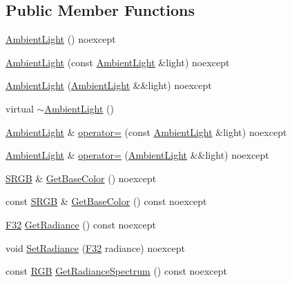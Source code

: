 \subsection*{Public Member Functions}
\begin{DoxyCompactItemize}
\item 
\hyperlink{classmage_1_1rendering_1_1_ambient_light_a178327bf02552f65b98ad3858416a81d}{Ambient\+Light} () noexcept
\item 
\hyperlink{classmage_1_1rendering_1_1_ambient_light_a363ca4f79eef6f0a95a2e3d381479af1}{Ambient\+Light} (const \hyperlink{classmage_1_1rendering_1_1_ambient_light}{Ambient\+Light} \&light) noexcept
\item 
\hyperlink{classmage_1_1rendering_1_1_ambient_light_a8bd09baed470ce2c09af6a9893549937}{Ambient\+Light} (\hyperlink{classmage_1_1rendering_1_1_ambient_light}{Ambient\+Light} \&\&light) noexcept
\item 
virtual \hyperlink{classmage_1_1rendering_1_1_ambient_light_a811cb86e80188b924085674a88a0bf7b}{$\sim$\+Ambient\+Light} ()
\item 
\hyperlink{classmage_1_1rendering_1_1_ambient_light}{Ambient\+Light} \& \hyperlink{classmage_1_1rendering_1_1_ambient_light_a351cdcd2e1b25c6a44356060f0e61c2b}{operator=} (const \hyperlink{classmage_1_1rendering_1_1_ambient_light}{Ambient\+Light} \&light) noexcept
\item 
\hyperlink{classmage_1_1rendering_1_1_ambient_light}{Ambient\+Light} \& \hyperlink{classmage_1_1rendering_1_1_ambient_light_aa571cc046cb35ceafba6cb0a2ec4bd6c}{operator=} (\hyperlink{classmage_1_1rendering_1_1_ambient_light}{Ambient\+Light} \&\&light) noexcept
\item 
\hyperlink{structmage_1_1_s_r_g_b}{S\+R\+GB} \& \hyperlink{classmage_1_1rendering_1_1_ambient_light_a0b45abc0f1cf9e9fae345c8574238432}{Get\+Base\+Color} () noexcept
\item 
const \hyperlink{structmage_1_1_s_r_g_b}{S\+R\+GB} \& \hyperlink{classmage_1_1rendering_1_1_ambient_light_a9396951fe2029233ce1f6b4ff38dcc8b}{Get\+Base\+Color} () const noexcept
\item 
\hyperlink{namespacemage_aa97e833b45f06d60a0a9c4fc22ae02c0}{F32} \hyperlink{classmage_1_1rendering_1_1_ambient_light_ad78278e798956e1c3a707a37dfb052da}{Get\+Radiance} () const noexcept
\item 
void \hyperlink{classmage_1_1rendering_1_1_ambient_light_a2da2e614906dc166121a0d0d391b9fc2}{Set\+Radiance} (\hyperlink{namespacemage_aa97e833b45f06d60a0a9c4fc22ae02c0}{F32} radiance) noexcept
\item 
const \hyperlink{structmage_1_1_r_g_b}{R\+GB} \hyperlink{classmage_1_1rendering_1_1_ambient_light_a480e6b39d92266254778c23e8456e55e}{Get\+Radiance\+Spectrum} () const noexcept
\end{DoxyCompactItemize}
